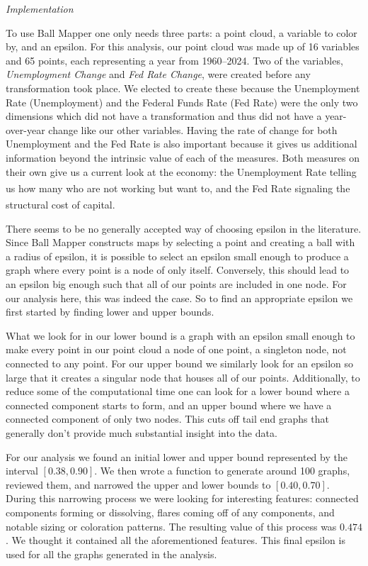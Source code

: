 \documentclass[10pt, letterpaper]{article}
\begin{document}
\emph{Implementation}

To use Ball Mapper one only needs three parts: a point cloud, a variable
to color by, and an epsilon. For this analysis, our point cloud was made
up of 16 variables and 65 points, each representing a year from
1960--2024. Two of the variables, \emph{Unemployment Change} and
\emph{Fed Rate Change}, were created before any transformation took
place. We elected to create these because the Unemployment Rate
(Unemployment) and the Federal Funds Rate (Fed Rate) were the only two
dimensions which did not have a transformation and thus did not have a
year-over-year change like our other variables. Having the rate of
change for both Unemployment and the Fed Rate is also important because
it gives us additional information beyond the intrinsic value of each of
the measures. Both measures on their own give us a current look at the
economy: the Unemployment Rate telling us how many who are not working
but want
to,\textsuperscript{} and
the Fed Rate signaling the structural cost of
capital.\textsuperscript{}

There seems to be no generally accepted way of choosing epsilon in the
literature. Since Ball Mapper constructs maps by selecting a point and
creating a ball with a radius of epsilon, it is possible to select an
epsilon small enough to produce a graph where every point is a node of
only itself. Conversely, this should lead to an epsilon big enough such
that all of our points are included in one node. For our analysis here,
this was indeed the case. So to find an appropriate epsilon we first
started by finding lower and upper bounds.

What we look for in our lower bound is a graph with an epsilon small
enough to make every point in our point cloud a node of one point, a
singleton node, not connected to any point. For our upper bound we
similarly look for an epsilon so large that it creates a singular node
that houses all of our points. Additionally, to reduce some of the
computational time one can look for a lower bound where a connected
component starts to form, and an upper bound where we have a connected
component of only two nodes. This cuts off tail end graphs that
generally don't provide much substantial insight into the data.

For our analysis we found an initial lower and upper bound represented
by the interval \([0.38, 0.90]\). We then wrote a function to generate
around 100 graphs, reviewed them, and narrowed the upper and lower
bounds to \([0.40, 0.70]\). During this narrowing process we were
looking for interesting features: connected components forming or
dissolving, flares coming off of any components, and notable sizing or
coloration patterns. The resulting value of this process was \(0.474\).
We thought it contained all the aforementioned features. This final
epsilon is used for all the graphs generated in the analysis.
\end{document}
